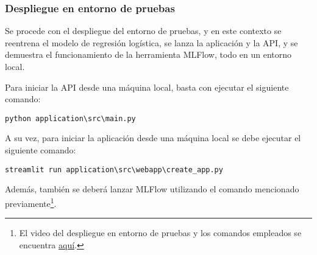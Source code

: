 \newpage

\subsubsection{Despliegue en entorno de pruebas}

Se procede con el despliegue del entorno de pruebas, y en este contexto se reentrena el modelo de regresión logística, se lanza la aplicación y la API, y se demuestra el funcionamiento de la herramienta MLFlow, todo en un entorno local.

Para iniciar la API desde una máquina local, basta con ejecutar el siguiente comando: \begin{verbatim}python application\src\main.py\end{verbatim}

A su vez, para iniciar la aplicación desde una máquina local se debe ejecutar el siguiente comando: \begin{verbatim}streamlit run application\src\webapp\create_app.py\end{verbatim}

Además, también se deberá lanzar MLFlow utilizando el comando mencionado previamente\footnote{El video del despliegue en entorno de pruebas y los comandos empleados se encuentra \href{https://youtu.be/1rctGi8Sb7Q}{aquí}.}.